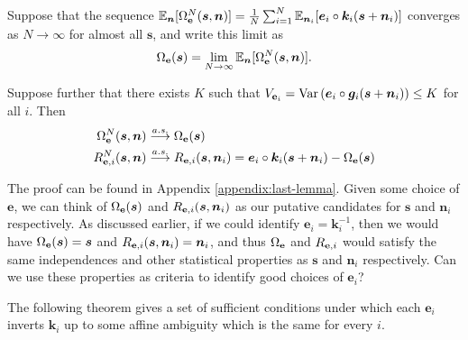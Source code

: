 \begin{lemma}\label{lem:last-lemma}
	Suppose that the sequence $\mathbb{E}_{\bm{n}}[\Omega_{\mathbf{e}}^N(\bm{s}, \bm{n})] = \frac{1}{N}\sum_{i=1}^N \mathbb{E}_{\bm{n}_i}[\bm{e}_i\circ \bm{k}_i( \bm{s} + \bm{n}_i)] $ converges as $N \to \infty$ for almost all $\bm{s}$, and write this limit as
	\begin{align*}
	\Omega_{\mathbf{e}}(\bm{s}) = \lim_{N\to\infty}\mathbb{E}_{\bm{n}}[\Omega_{\mathbf{e}}^N(\bm{s}, \bm{n})].
	\end{align*}
	
	Suppose further that there exists $K$ such that $V_{\mathbf{e}_i} = \mathrm{Var}\left(\bm{e}_i \circ \bm{g}_i(\bm{s} + \bm{n}_i) \right) \leq K$ for all $i$.
	Then
	\begin{align*}
	\Omega_{\mathbf{e}}^N(\bm{s}, \bm{n}) & \overset{a.s.}{\longrightarrow} \Omega_{\mathbf{e}}(\bm{s}) \\
	R_{\mathbf{e}, i}^N(\bm{s}, \bm{n}) & \overset{a.s.}{\longrightarrow} R_{\mathbf{e}, i}(\bm{s}, \bm{n}_i) = \bm{e}_i\circ \bm{k}_i( \bm{s} + \bm{n}_i) - \Omega_{\mathbf{e}}(\bm{s})
	\end{align*}
\end{lemma}

The proof can be found in Appendix \ref{appendix:last-lemma}.
Given some choice of $\bm{e}$, we can think of $\Omega_{\mathbf{e}}(\bm{s})$ and $R_{\mathbf{e}, i}(\bm{s}, \bm{n}_i)$ as our putative candidates for $\bm{s}$ and $\bm{n}_i$ respectively.
As discussed earlier, if we could identify $\bm{e}_i=\bm{k}_i^{-1}$, then we would have $\Omega_{\mathbf{e}}(\bm{s}) = \bm{s}$ and $R_{\mathbf{e}, i}(\bm{s}, \bm{n}_i) = \bm{n}_i$, and thus $\Omega_{\mathbf{e}}$ and $R_{\mathbf{e}, i}$ would satisfy the same independences and other statistical properties as $\bm{s}$ and $\bm{n}_i$ respectively.
Can we use these properties as criteria to identify good choices of $\bm{e}_i$?

The following theorem gives a set of sufficient conditions under which each $\bm{e}_i$ inverts $\bm{k}_i$ up to some affine ambiguity which is the same for every $i$.

\medskip


